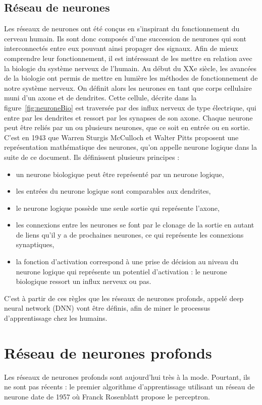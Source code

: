 \subsection{Réseau de neurones}
Les réseaux de neurones ont été conçus en s'inspirant du fonctionnement du cerveau humain. Ils sont donc composés d'une succession de neurones qui sont interconnectés entre eux pouvant ainsi propager des signaux.
Afin de mieux comprendre leur fonctionnement, il est intéressant de les mettre en relation avec la biologie du système nerveux de l'humain.
Au début du XXe siècle, les avancées de la biologie ont permis de mettre en lumière les méthodes de fonctionnement de notre système nerveux. On définit alors les neurones en tant que corps cellulaire muni d’un axone et de dendrites. Cette cellule, décrite dans la figure~\ref{fig:neuroneBio} est traversée par des influx nerveux de type électrique, qui entre par les dendrites et ressort par les synapses de son axone. Chaque neurone peut être reliés par un ou plusieurs neurones, que ce soit en entrée ou en sortie.
C'est en 1943 que Warren Sturgis McCulloch et Walter Pitts proposent une représentation mathématique des neurones, qu'on appelle neurone logique dans la suite de ce document. Ils définissent plusieurs principes :
\begin{itemize}
  \item un neurone biologique peut être représenté par un neurone logique,
  \item les entrées du neurone logique sont comparables aux dendrites,
  \item le neurone logique possède une seule sortie qui représente l'axone,
  \item les connexions entre les neurones se font par le clonage de la sortie en autant de liens qu'il y a de prochaines neurones, ce qui représente les connexions synaptiques,
  \item la fonction d'activation correspond à une prise de décision au niveau du neurone logique qui représente un potentiel d'activation : le neurone biologique ressort un influx nerveux ou pas.
\end{itemize}
C'est à partir de ces règles que les réseaux de neurones profonds, appelé deep neural network (DNN) vont être définis, afin de miner le processus d'apprentissage chez les humains.

\section{Réseau de neurones profonds}
Les réseaux de neurones profonds sont aujourd'hui très à la mode. Pourtant, ils ne sont pas récents : le premier algorithme d'apprentissage utilisant un réseau de neurone date de 1957 où Franck Rosenblatt propose le perceptron.

